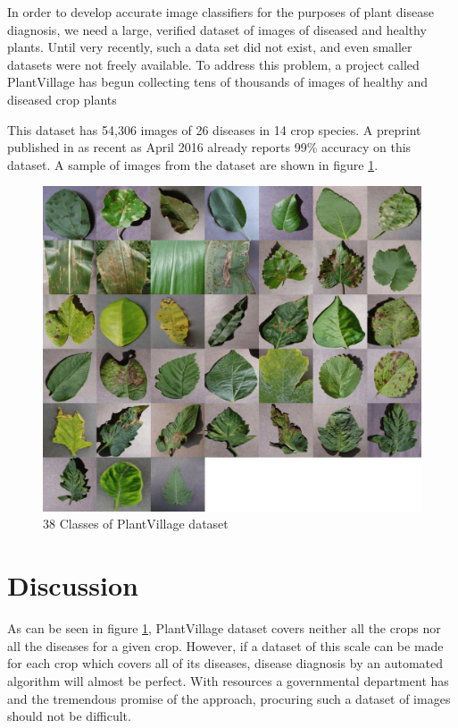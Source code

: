\documentclass[a4paper]{scrartcl}
\begin{document}
In order to develop accurate image classifiers for the purposes of plant disease diagnosis, we need a large, verified dataset of images of diseased and healthy plants. Until very recently, such a data set did not exist, and even smaller datasets were not freely available. To address this problem, a project called PlantVillage has begun collecting tens of thousands of images of healthy and diseased crop plants \cite{hughes2015open, mohanty2016inference}

This dataset has 54,306 images of 26 diseases in 14 crop species. 
A preprint published in as recent as April 2016 already reports 99\% accuracy on this dataset\cite{mohanty2016inference}.
A sample of images from the dataset are shown in figure \ref{fig:leaf}.


\begin{figure}[ht]
\includegraphics[width=14cm]{plantvillage-min.png}
\centering
\caption{38 Classes of PlantVillage dataset}
\label{fig:leaf}
\end{figure}

\section{Discussion}
As can be seen in figure \ref{fig:leaf}, PlantVillage dataset covers neither all the crops nor all the diseases for a given crop. 
However, if a dataset of this scale can be made for each crop which covers all of its diseases, disease diagnosis by an automated algorithm will almost be perfect. 
With resources a governmental department has and the tremendous promise of the approach, procuring such a dataset of images should not be difficult.
\end{document}
